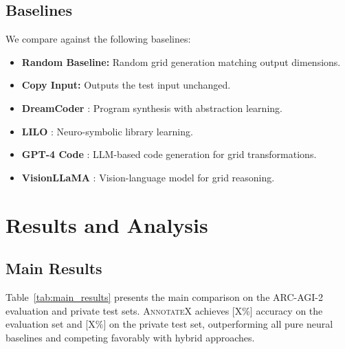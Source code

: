 \documentclass[conference,10pt,letterpaper]{IEEEtran}
\newcommand{\annotatexname}{\textsc{AnnotateX}}
\begin{document}
\subsection{Baselines}

We compare against the following baselines:
\begin{itemize}[leftmargin=*,nosep]
    \item \textbf{Random Baseline:} Random grid generation matching output dimensions.
    \item \textbf{Copy Input:} Outputs the test input unchanged.
    \item \textbf{DreamCoder} \cite{ellis2021dreamcoder}: Program synthesis with abstraction learning.
    \item \textbf{LILO} \cite{valmeekam2023lilo}: Neuro-symbolic library learning.
    \item \textbf{GPT-4 Code} \cite{gc3732024}: LLM-based code generation for grid transformations.
    \item \textbf{VisionLLaMA} \cite{zhang2024visual}: Vision-language model for grid reasoning.
\end{itemize}

\section{Results and Analysis}
\label{sec:results}

\subsection{Main Results}

Table~\ref{tab:main_results} presents the main comparison on the ARC-AGI-2 evaluation and private test sets. \annotatexname{} achieves [X\%] accuracy on the evaluation set and [X\%] on the private test set, outperforming all pure neural baselines and competing favorably with hybrid approaches.
\end{document}
